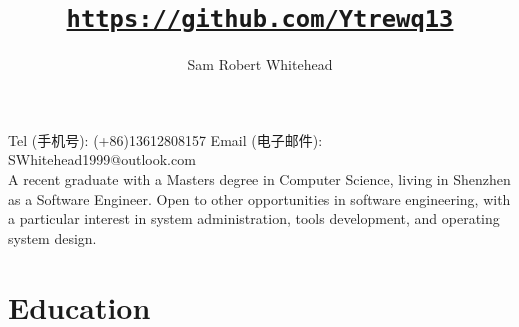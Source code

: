 



\title{\href{https://github.com/Ytrewq13}{\texttt{https://github.com/Ytrewq13}}}
\author{Sam Robert Whitehead}

\maketitle

\pagestyle{empty}
\thispagestyle{empty}

Tel (手机号): (+86)13612808157 \hfill
Email (电子邮件): SWhitehead1999@outlook.com\\
A recent graduate with a Masters degree in Computer Science, living in Shenzhen
as a Software Engineer. Open to other opportunities in software engineering,
with a particular interest in system administration, tools development, and
operating system design.

\section{Education}
